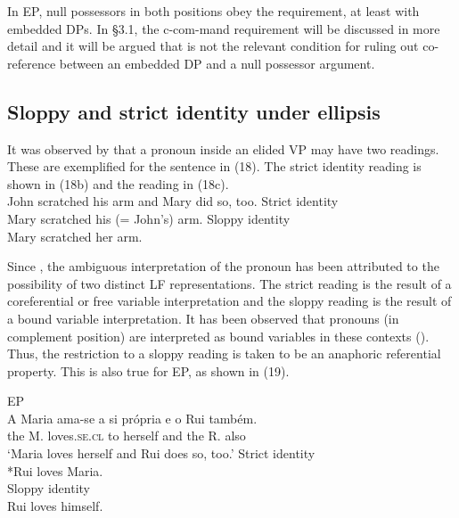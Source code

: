 \documentclass[output=paper]{langsci/langscibook}
\begin{document}
In EP, null possessors in both positions obey the  requirement, at least with embedded DPs. In §3.1, the c-com-mand requirement will be discussed in more detail and it will be argued that  is not the relevant condition for ruling out co-reference between an embedded DP and a null possessor argument.

\subsection{Sloppy and strict identity under ellipsis}%

It was observed by \citet{Ross1967,Ross1969} that a pronoun inside an elided VP may have two readings. These are exemplified for the sentence in (18). The strict identity reading is shown in (18b) and the  reading in (18c).
\pagebreak
\ea%
\citep[207]{Ross1967}\label{ex:wein:18}\\
\ea John scratched his arm and Mary did so, too.
\ex Strict identity\\Mary scratched his (= John’s) arm.
\ex Sloppy identity\\Mary scratched her arm.
\z
\z

Since \citet{Sag1980}, the ambiguous interpretation of the pronoun has been attributed to the possibility of two distinct LF representations. The strict reading is the result of a coreferential or free variable interpretation and the sloppy reading is the result of a bound variable interpretation. It has been observed that  pronouns (in complement position) are interpreted as bound variables in these contexts (\citealt{Sag1980,Hicks2009}). Thus, the restriction to a sloppy reading is taken to be an anaphoric referential property. This is also true for EP, as shown in (19).

\ea%
    EP\label{ex:wein:19}\\
    \ea \gll A Maria ama-se a {si própria} e o Rui também.\\
         the M. loves.\textsc{se.cl} to herself and the R. also\\
    \glt ‘Maria loves herself and Rui does so, too.’
    \ex Strict identity\\
        *Rui loves Maria.\\
    \ex {}Sloppy identity\\
        Rui loves himself.
    \z
\z
          
\end{document}
